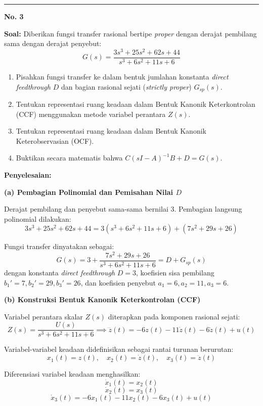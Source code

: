 \documentclass[11pt,a4paper]{article}
\begin{document}
\vspace{12pt}
\hrule
\vspace{10pt}

\textbf{\large No. 3}

\textbf{Soal:}  
Diberikan fungsi transfer rasional bertipe \textit{proper} dengan derajat pembilang sama dengan derajat penyebut:
$$G(s) = \frac{3s^3 + 25s^2 + 62s + 44}{s^3 + 6s^2 + 11s + 6}$$
\begin{enumerate}[label=(\alph*)]
    \item Pisahkan fungsi transfer ke dalam bentuk jumlahan konstanta \textit{direct feedthrough} $D$ dan bagian rasional sejati (\textit{strictly proper}) $G_{sp}(s)$.
    \item Tentukan representasi ruang keadaan dalam Bentuk Kanonik Keterkontrolan (CCF) menggunakan metode variabel perantara $Z(s)$.
    \item Tentukan representasi ruang keadaan dalam Bentuk Kanonik Keterobservasian (OCF).
    \item Buktikan secara matematis bahwa $C(sI - A)^{-1} B + D = G(s)$.
\end{enumerate}

\textbf{Penyelesaian:}

\textbf{(a) Pembagian Polinomial dan Pemisahan Nilai $D$}

Derajat pembilang dan penyebut sama-sama bernilai 3. Pembagian langsung polinomial dilakukan:
$$3s^3 + 25s^2 + 62s + 44 = 3(s^3 + 6s^2 + 11s + 6) + (7s^2 + 29s + 26)$$

Fungsi transfer dinyatakan sebagai:
$$G(s) = 3 + \frac{7s^2 + 29s + 26}{s^3 + 6s^2 + 11s + 6} = D + G_{sp}(s)$$
dengan konstanta \textit{direct feedthrough} $D = 3$, koefisien sisa pembilang $b_1' = 7, b_2' = 29, b_3' = 26$, dan koefisien penyebut $a_1 = 6, a_2 = 11, a_3 = 6$.

\textbf{(b) Konstruksi Bentuk Kanonik Keterkontrolan (CCF)}

Variabel perantara skalar $Z(s)$ diterapkan pada komponen rasional sejati:
$$Z(s) = \frac{U(s)}{s^3 + 6s^2 + 11s + 6} \implies \dddot{z}(t) = -6z(t) - 11\dot{z}(t) - 6\ddot{z}(t) + u(t)$$

Variabel-variabel keadaan didefinisikan sebagai rantai turunan berurutan:
$$x_1(t) = z(t), \quad x_2(t) = \dot{z}(t), \quad x_3(t) = \ddot{z}(t)$$

Diferensiasi variabel keadaan menghasilkan:
$$\dot{x}_1(t) = x_2(t)$$
$$\dot{x}_2(t) = x_3(t)$$
$$\dot{x}_3(t) = -6x_1(t) - 11x_2(t) - 6x_3(t) + u(t)$$
\end{document}
